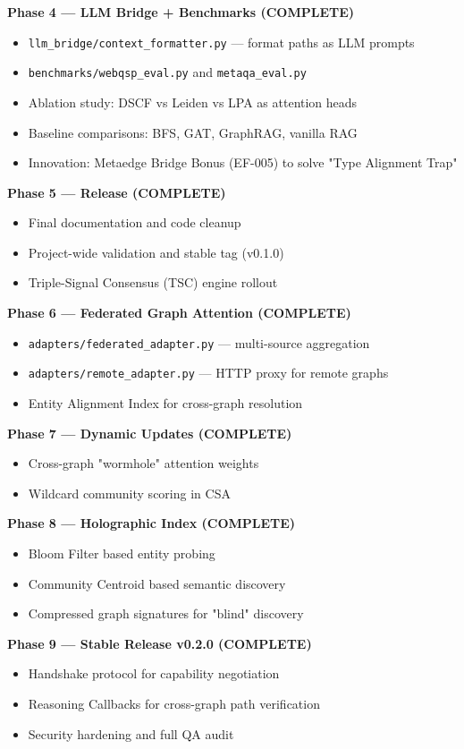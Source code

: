 \documentclass[10pt,journal,compsoc]{IEEEtran}
\begin{document}
\textbf{Phase 4 — LLM Bridge + Benchmarks (COMPLETE)}
\begin{itemize}
\item \texttt{llm\_bridge/context\_formatter.py} — format paths as LLM prompts
\item \texttt{benchmarks/webqsp\_eval.py} and \texttt{metaqa\_eval.py}
\item Ablation study: DSCF vs Leiden vs LPA as attention heads
\item Baseline comparisons: BFS, GAT, GraphRAG, vanilla RAG
\item Innovation: Metaedge Bridge Bonus (EF-005) to solve "Type Alignment Trap"

\end{itemize}
\textbf{Phase 5 — Release (COMPLETE)}
\begin{itemize}
\item Final docum\-entation and code cleanup
\item Project-wide validation and stable tag (v0.1.0)
\item Triple-Signal Consensus (TSC) engine rollout

\end{itemize}
\textbf{Phase 6 — Federated Graph Attention (COMPLETE)}
\begin{itemize}
\item \texttt{adapters/federated\_adapter.py} — multi-source aggregation
\item \texttt{adapters/remote\_adapter.py} — HTTP proxy for remote graphs
\item Entity Alignment Index for cross-graph resolution

\end{itemize}
\textbf{Phase 7 — Dynamic Updates (COMPLETE)}
\begin{itemize}
\item Cross-graph "wormhole" attention weights
\item Wildcard community scoring in CSA

\end{itemize}
\textbf{Phase 8 — Holographic Index (COMPLETE)}
\begin{itemize}
\item Bloom Filter based entity probing
\item Community Centroid based semantic discovery
\item Compressed graph signatures for "blind" discovery

\end{itemize}
\textbf{Phase 9 — Stable Release v0.2.0 (COMPLETE)}
\begin{itemize}
\item Handshake protocol for capability negotiation
\item Reasoning Callbacks for cross-graph path verif\-ication
\item Security hardening and full QA audit

\end{itemize}
\end{document}
